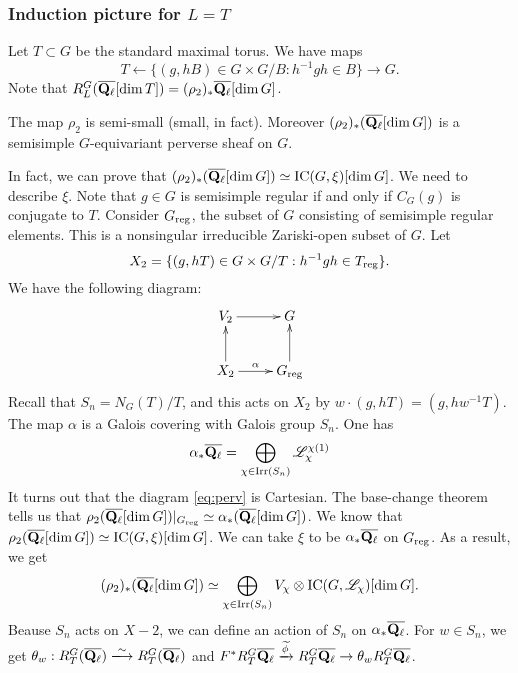 \subsubsection{Induction picture for \texorpdfstring{$L=T$}{L=T}}

Let $T\subset G$ be the standard maximal torus. We have maps 
\[
  T \leftarrow \{(g,h B)\in G\times G/B:h^{-1} g h \in B\} \to G .
\]
Note that 
$R_L^G(\overline{\mathbf{Q}_\ell}[\dim T]) = (\rho_2)_\ast \overline{\mathbf{Q}_\ell}[\dim G]$. 

\begin{theo}
The map $\rho_2$ is semi-small (small, in fact). Moreover 
$(\rho_2)_\ast (\overline{\mathbf{Q}_\ell}[\dim G])$ is a semisimple $G$-equivariant 
perverse sheaf on $G$. 
\end{theo}

In fact, we can prove that 
$(\rho_2)_\ast (\overline{\mathbf{Q}_\ell}[\dim G]) \simeq \operatorname{IC}(G,\xi)[\dim G]$. 
We need to describe $\xi$. Note that $g\in G$ is semisimple regular if and only if 
$C_G(g)$ is conjugate to $T$. Consider $G_{\mathrm{reg}}$, the subset of $G$ consisting 
of semisimple regular elements. This is a nonsingular irreducible Zariski-open 
subset of $G$. Let 
\[
  X_2 = \{(g, h T)\in G\times G/T:h^{-1} g h\in T_{\mathrm{reg}}\} .
\]
We have the following diagram: 
\begin{equation}\label{eq:perv}
\xymatrix{
  V_2 \ar[r] 
    & G \\
  X_2 \ar[r]^-\alpha \ar[u] 
    & G_\regular \ar[u] .
}
\end{equation}
Recall that $S_n=N_G(T)/T$, and this acts on $X_2$ by 
$w\cdot (g, h T) = (g, h w^{-1} T)$. The map $\alpha$ is a Galois covering 
with Galois group $S_n$. One has 
\[
  \alpha_\ast \overline{\mathbf{Q}_\ell} = \bigoplus_{\chi\in \operatorname{Irr}(S_n)}\mathscr{L}_\chi^{\chi(1)}
\]
It turns out that the diagram \eqref{eq:perv} is Cartesian. The base-change 
theorem tells us that 
$\rho_2(\overline{\mathbf{Q}_\ell}[\dim G])|_{G_{\mathrm{reg}}} \simeq \alpha_\ast (\overline{\mathbf{Q}_\ell}[\dim G])$. We know that 
$\rho_2(\overline{\mathbf{Q}_\ell}[\dim G]) \simeq \operatorname{IC}(G,\xi)[\dim G]$. 
We can take $\xi$ to be $\alpha_\ast \overline{\mathbf{Q}_\ell}$ on 
$G_{\mathrm{reg}}$. As a result, we get 
\[
  (\rho_2)_\ast (\overline{\mathbf{Q}_\ell}[\dim G]) \simeq \bigoplus_{\chi\in \operatorname{Irr}(S_n)} V_\chi \otimes \operatorname{IC}(G,\mathscr{L}_\chi)[\dim G] .
\]
Beause $S_n$ acts on $X-2$, we can define an action of $S_n$ on 
$\alpha_\ast \overline{\mathbf{Q}_\ell}$. For $w\in S_n$, we get 
$\theta_w:R_T^G(\overline{\dQ_\ell}) \isomorphism R_T^G(\overline{\dQ_\ell})$ 
and $F^\ast R_T^G\overline{\mathbf{Q}_\ell} \xrightarrow{\widetilde\phi} R_T^G\overline{\mathbf{Q}_\ell} \rightarrow{\theta_w} R_T^G\overline{\mathbf{Q}_\ell}$. 

